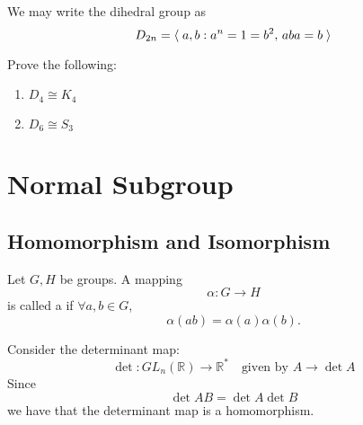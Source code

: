 \documentclass[notoc,notitlepage]{tufte-book}
\begin{document}
\begin{eg}
  We may write the dihedral group as
  \begin{equation*}
    D_{2n} = \langle \;  a, b : a^n = 1 = b^2, \, aba = b  \; \rangle
  \end{equation*}
\end{eg}

\begin{ex}
  Prove the following:
  \begin{enumerate}
    \item $D_4 \cong K_4$
    \item $D_6 \cong S_3$
  \end{enumerate}
\end{ex}



\section{Normal Subgroup}%
\label{sec:normal_subgroup}

\subsection{Homomorphism and Isomorphism}%
\label{sub:homomorphism_and_isomorphism}

\begin{defn}[Homomorphism]
\label{defn:homomorphism}
  Let $G, H$ be groups. A mapping
  \begin{equation*}
    \alpha : G \to H
  \end{equation*}
  is called a  if $\forall a, b \in G$,
  \begin{equation*}
    \alpha(ab) = \alpha(a)\alpha(b).
  \end{equation*}
\end{defn}

\begin{eg}\label{eg:homomorphism_classical_eg}
  Consider the determinant map:
  \begin{equation*}
    \det : GL_n(\mathbb{R}) \to \mathbb{R}^* \quad \text{given by } A \to \det A
  \end{equation*}
  Since
  \begin{equation*}
    \det AB = \det A \det B
  \end{equation*}
  we have that the determinant map is a homomorphism.
\end{eg}
\end{document}
